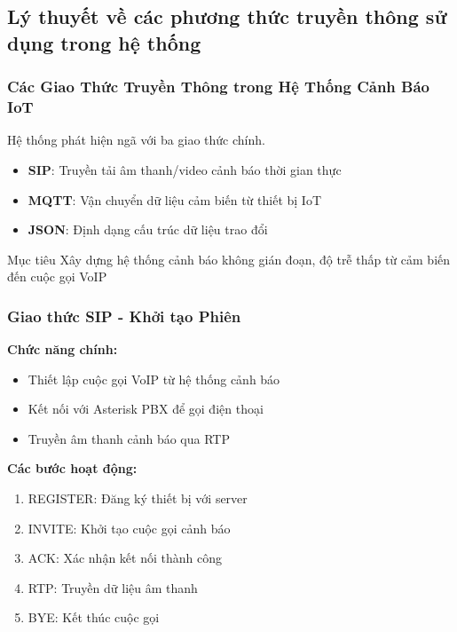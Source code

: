 \subsection{Lý thuyết về các phương thức truyền thông sử dụng trong hệ thống}

\begin{frame}
\frametitle{Các Giao Thức Truyền Thông trong Hệ Thống Cảnh Báo IoT}
\begin{center}
\Large Hệ thống phát hiện ngã với ba giao thức chính.
\end{center}

\begin{itemize}
\item \textbf{SIP}: Truyền tải âm thanh/video cảnh báo thời gian thực
\item \textbf{MQTT}: Vận chuyển dữ liệu cảm biến từ thiết bị IoT
\item \textbf{JSON}: Định dạng cấu trúc dữ liệu trao đổi
\end{itemize}

\begin{block}{Mục tiêu}
Xây dựng hệ thống cảnh báo không gián đoạn, độ trễ thấp từ cảm biến đến cuộc gọi VoIP
\end{block}
\end{frame}

\begin{frame}
\frametitle{Giao thức SIP - Khởi tạo Phiên}
\textbf{Chức năng chính:}
\begin{itemize}
\item Thiết lập cuộc gọi VoIP từ hệ thống cảnh báo
\item Kết nối với Asterisk PBX để gọi điện thoại
\item Truyền âm thanh cảnh báo qua RTP
\end{itemize}

\textbf{Các bước hoạt động:}
\begin{enumerate}
\item REGISTER: Đăng ký thiết bị với server
\item INVITE: Khởi tạo cuộc gọi cảnh báo
\item ACK: Xác nhận kết nối thành công
\item RTP: Truyền dữ liệu âm thanh
\item BYE: Kết thúc cuộc gọi
\end{enumerate}
\end{frame}

